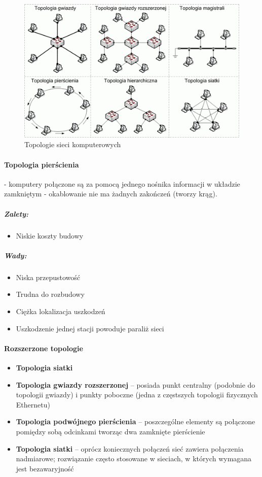 \documentclass[]{report}
\begin{document}
\begin{figure}[htbp]
\centering
\includegraphics[scale=1]{obrazy/topologie.png}
\caption{Topologie sieci komputerowych}
\label{rys:topologie_sieci_komp}
\end{figure}

\paragraph{Topologia pierścienia} - komputery połączone są za pomocą jednego nośnika informacji w układzie zamkniętym - okablowanie nie ma żadnych zakończeń (tworzy krąg).
\subparagraph{Zalety:}
\begin{itemize}
\item Niskie koszty budowy
\end{itemize}
\subparagraph{Wady:}
\begin{itemize}
\item Niska przepustowość
\item Trudna do rozbudowy
\item Ciężka lokalizacja uszkodzeń
\item Uszkodzenie jednej stacji powoduje paraliż sieci
\end{itemize}

\paragraph{Rozszerzone topologie}
\begin{itemize}
\item \textbf{Topologia siatki}
\item \textbf{Topologia gwiazdy rozszerzonej} – posiada punkt centralny (podobnie do topologii gwiazdy) i punkty poboczne (jedna z częstszych topologii fizycznych Ethernetu)
\item \textbf{Topologia podwójnego pierścienia} – poszczególne elementy są połączone pomiędzy sobą odcinkami tworząc dwa zamknięte pierścienie
\item \textbf{Topologia siatki} – oprócz koniecznych połączeń sieć zawiera połączenia nadmiarowe; rozwiązanie często stosowane w sieciach, w których wymagana jest bezawaryjność
\end{itemize}
\end{document}
